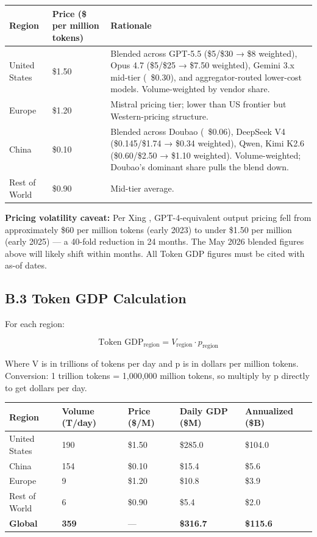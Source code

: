 \documentclass[11pt,a4paper]{article}
\begin{document}
\begin{center}
\begin{tabular}{lll}
\toprule
Region & Price (\$ per million tokens) & Rationale \\
\midrule
United States & \$1.50 & Blended across GPT-5.5 (\$5/\$30 → \$8 weighted), Opus 4.7 (\$5/\$25 → \$7.50 weighted), Gemini 3.x mid-tier (~\$0.30), and aggregator-routed lower-cost models. Volume-weighted by vendor share. \\
Europe & \$1.20 & Mistral pricing tier; lower than US frontier but Western-pricing structure. \\
China & \$0.10 & Blended across Doubao (~\$0.06), DeepSeek V4 (\$0.145/\$1.74 → \$0.34 weighted), Qwen, Kimi K2.6 (\$0.60/\$2.50 → \$1.10 weighted). Volume-weighted; Doubao's dominant share pulls the blend down. \\
Rest of World & \$0.90 & Mid-tier average. \\
\bottomrule
\end{tabular}
\end{center}


\textbf{Pricing volatility caveat:} Per Xing \cite{xing2026token}, GPT-4-equivalent output pricing fell from approximately \$60 per million tokens (early 2023) to under \$1.50 per million (early 2025) --- a 40-fold reduction in 24 months. The May 2026 blended figures above will likely shift within months. All Token GDP figures must be cited with as-of dates.

\subsection{B.3 Token GDP Calculation}

For each region:

\begin{equation*}
 \text{Token GDP}_{\text{region}} = V_{\text{region}} \cdot p_{\text{region}} 
\end{equation*}

Where V is in trillions of tokens per day and p is in dollars per million tokens. Conversion: 1 trillion tokens = 1,000,000 million tokens, so multiply by p directly to get dollars per day.

\begin{center}
\begin{tabular}{lllll}
\toprule
Region & Volume (T/day) & Price (\$/M) & Daily GDP (\$M) & Annualized (\$B) \\
\midrule
United States & 190 & \$1.50 & \$285.0 & \$104.0 \\
China & 154 & \$0.10 & \$15.4 & \$5.6 \\
Europe & 9 & \$1.20 & \$10.8 & \$3.9 \\
Rest of World & 6 & \$0.90 & \$5.4 & \$2.0 \\
\textbf{Global} & \textbf{359} & — & \textbf{\$316.7} & \textbf{\$115.6} \\
\bottomrule
\end{tabular}
\end{center}
\end{document}
